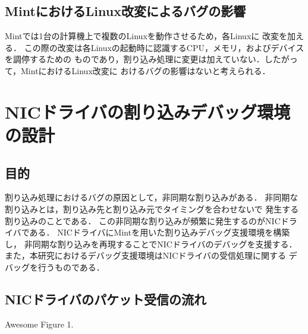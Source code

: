 \documentclass[tanilab-enum]{graduate}
\begin{document}
\section{MintにおけるLinux改変によるバグの影響}
Mintでは1台の計算機上で複数のLinuxを動作させるため，各Linuxに
改変を加える\cite{kitagawa}．
この際の改変は各Linuxの起動時に認識するCPU，メモリ，およびデバイスを調停するための
ものであり，割り込み処理に変更は加えていない．したがって，MintにおけるLinux改変に
おけるバグの影響はないと考えられる．
\chapter{NICドライバの割り込みデバッグ環境の設計}\label{chap:plan}
\section{目的}
割り込み処理におけるバグの原因として，非同期な割り込みがある．
非同期な割り込みとは，割り込み先と割り込み元でタイミングを合わせないで
発生する割り込みのことである．
この非同期な割り込みが頻繁に発生するのがNICドライバである．
NICドライバにMintを用いた割り込みデバッグ支援環境を構築し，
非同期な割り込みを再現することでNICドライバのデバッグを支援する．
また，本研究におけるデバッグ支援環境はNICドライバの受信処理に関する
デバッグを行うものである．
\section{NICドライバのパケット受信の流れ}
{Awesome Figure 1.}
\end{document}
